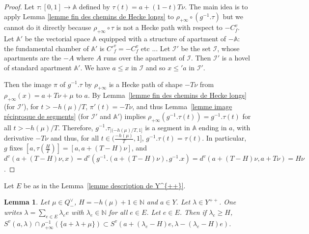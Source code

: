 \documentclass[12pt]{article}
\theoremstyle{plain}
\newtheorem{lemma}[theorem]{Lemma}
\theoremstyle{definition}
\newcommand{\A}{\mathbb{A}}
\newcommand{\N}{\mathbb{N}}
\newcommand{\I}{\mathcal{I}}
\begin{document}
\begin{proof} Let $\tau:[0,1]\rightarrow \mathbb{A}$ defined by $\tau(t)=a+(1-t)T\nu$. The main idea is to apply Lemma \ref{lemme fin des chemins de Hecke longs} to $\rho_{+\infty}\circ (g^{-1}.\tau)$ but we cannot do it directly because $\rho_{+\infty}\circ\tau$ is not a Hecke path with respect to $-C^v_f$. Let $\mathbb{A}'$ be the vectorial space $\mathbb{A}$ equipped with a structure of apartment of $-\mathbb{A}$: the fundamental chamber of $\mathbb{A}'$ is $C'^v_f=-C^v_f$ etc ... Let $\mathcal{I}'$ be the set $\mathcal{I}$, whose apartments are the $-A$ where $A$ runs over the apartment of $\I$. Then $\mathcal{I}'$ is a hovel of standard apartment $\mathbb{A}'$. We have $a\leq x$ in $\mathcal{I}$ and so $x\leq'a$ in $\mathcal{I}'$. 
 
Then the image $\pi$ of $g^{-1}.\tau$ by $\rho_{+\infty}$ is a Hecke path of shape $-T\nu$ from $\rho_{+\infty}(x)=a+T\nu +\mu$ to $a$. By Lemma~\ref{lemme fin des chemins de Hecke longs} (for $\I'$), for $t>-h(\mu)/T$, $\pi'(t)=-T\nu$, and thus Lemma~\ref{lemme image réciproque de segments} (for $\I'$ and $\A'$) implies $\rho_{+\infty}(g^{-1}.\tau(t))=g^{-1}.\tau(t)$ for all $t>-h(\mu)/T$. Therefore, $g^{-1}.\tau_{|(-h(\mu)/T,1]}$ is a segment in $\A$ ending in $a$, with derivative $-T\nu$ and thus, for all $t\in (\frac{-h(\mu)}{T},1]$, $g^{-1}.\tau(t)=\tau(t)$.
 In particular, $g$ fixes $[a,\tau(\frac{H}{T})]=[a,a+(T-H)\nu]$, and $d^v(a+(T-H)\nu,x)=d^v(g^{-1}.(a+(T-H)\nu),g^{-1}.x)=d^v(a+(T-H)\nu,a+T\nu)=H\nu$.  
\end{proof}












Let $E$ be as in the Lemma~\ref{lemme description de Y^{++}}. 
 
 
\begin{lemma}\label{lemme distance finie à l'appartement bis}
Let $\mu\in Q^\vee_-$, $H=-h(\mu)+1\in \N$ and $a\in Y$. Let $\lambda\in Y^{++}$. One writes $\lambda=\sum_{e\in E}\lambda_e e$ with $\lambda_e\in\N$ for all $e\in E$. Let $e\in E$. Then if $\lambda_e\geq H$, $S^v(a,\lambda)\cap\rho_{+\infty}^{-1}(\{a+\lambda+\mu\})\subset S^v(a+(\lambda_e -H)e,\lambda-(\lambda_e-H)e)$. 
\end{lemma} 
\end{document}

